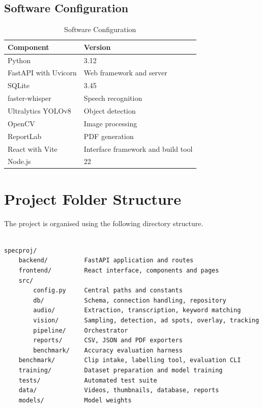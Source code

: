 \documentclass[12pt,a4paper,twoside]{report}
\begin{document}
\subsection{Software Configuration}

\begin{table}[h]
\centering
\begin{tabular}{|p{5cm}|p{7cm}|}
\hline
\textbf{Component} & \textbf{Version} \\
\hline
Python & 3.12 \\
\hline
FastAPI with Uvicorn & Web framework and server \\
\hline
SQLite & 3.45 \\
\hline
faster-whisper & Speech recognition \\
\hline
Ultralytics YOLOv8 & Object detection \\
\hline
OpenCV & Image processing \\
\hline
ReportLab & PDF generation \\
\hline
React with Vite & Interface framework and build tool \\
\hline
Node.js & 22 \\
\hline
\end{tabular}
\caption{Software Configuration}
\end{table}

\section{Project Folder Structure}

The project is organised using the following directory structure.

\begin{verbatim}

specproj/
    backend/          FastAPI application and routes
    frontend/         React interface, components and pages
    src/
        config.py     Central paths and constants
        db/           Schema, connection handling, repository
        audio/        Extraction, transcription, keyword matching
        vision/       Sampling, detection, ad spots, overlay, tracking
        pipeline/     Orchestrator
        reports/      CSV, JSON and PDF exporters
        benchmark/    Accuracy evaluation harness
    benchmark/        Clip intake, labelling tool, evaluation CLI
    training/         Dataset preparation and model training
    tests/            Automated test suite
    data/             Videos, thumbnails, database, reports
    models/           Model weights

\end{verbatim}
\end{document}
